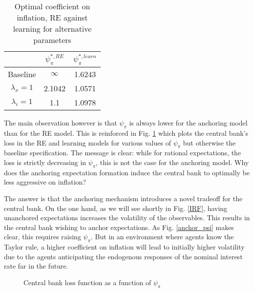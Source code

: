 \documentclass[11pt]{article}
\def \myFigPath {../../figures/}
\renewcommand{\[}{\begin{equation}}
\renewcommand{\]}{\end{equation}}
\def\mySmallerFigScale{0.18}
\begin{document}
\begin{center}
\begin{table}[h!]
\begin{tabular}{ c | c | c }
 & $\psi^{*,RE}_{\pi}$ & $\psi^{*,learn}_{\pi}$  \\  \hline
  Baseline  & $\infty$  & 1.6243 \\  \hline
 $\lambda_x =1 $ & 2.1042  & 1.0571 \\  \hline
 $\lambda_i =1 $ &  1.1  & 1.0978 \\  \hline
\end{tabular}     
      \caption{Optimal coefficient on inflation, RE against learning for alternative parameters}  \label{par_opt}
 \end{table}
\end{center}

\vspace{-1.4cm}
The main observation however is that $\psi_{\pi}$ is always lower for the anchoring model than for the RE model. This is reinforced in Fig. \ref{fig_loss} which plots the central bank's loss in the RE and learning models for various values of $\psi_{\pi}$ but otherwise the baseline specification. The message is clear: while for rational expectations, the loss is strictly decreasing in $\psi_{\pi}$, this is not the case for the anchoring model. Why does the anchoring expectation formation induce the central bank to optimally be less aggressive on inflation?

The answer is that the anchoring mechanism introduces a novel tradeoff for the central bank. On the one hand, as we will see shortly in Fig. \ref{IRF}, having unanchored expectations increases the volatility of the observables. This results in the central bank wishing to anchor expectations. As Fig. \ref{anchor_psi} makes clear, this requires raising $\psi_{\pi}$. But in an environment where agents know the Taylor rule, a higher coefficient on inflation will lead to initially higher volatility due to the agents anticipating the endogenous responses of the nominal interest rate far in the future.
\begin{figure}[h!]
\caption{Central bank loss function as a function of $\psi_{\pi}$}
\floatfoot{}
\label{fig_loss}
\end{figure}
\end{document}
